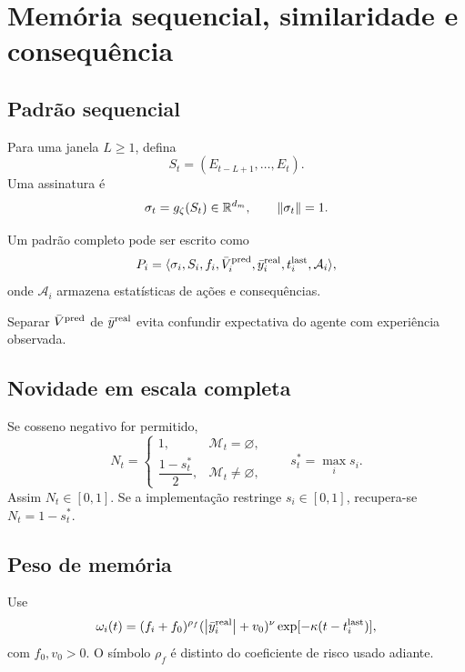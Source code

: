 \section{Memória sequencial, similaridade e consequência}

\subsection{Padrão sequencial}

Para uma janela \(L\ge1\), defina
\begin{equation}
S_t=(E_{t-L+1},\ldots,E_t).
\end{equation}
Uma assinatura é
\begin{equation}
\sigma_t=g_\zeta(S_t)\in\mathbb{R}^{d_m},
\qquad
\left\lVert \sigma_t \right\rVert=1.
\end{equation}

Um padrão completo pode ser escrito como
\begin{equation}
P_i=\langle
\sigma_i,S_i,f_i,
\bar V_i^{\rm pred},
\bar y_i^{\rm real},
t_i^{\rm last},
\mathcal A_i
\rangle,
\label{eq:pattern_advanced}
\end{equation}
onde \(\mathcal A_i\) armazena estatísticas de ações e consequências.

Separar \(\bar V^{\rm pred}\) de \(\bar y^{\rm real}\) evita confundir expectativa do agente com experiência observada.

\subsection{Novidade em escala completa}

Se cosseno negativo for permitido,
\begin{equation}
N_t=
\begin{cases}
1, & \mathcal M_t=\varnothing,\\[1mm]
\dfrac{1-s_t^*}{2}, & \mathcal M_t\neq\varnothing,
\end{cases}
\qquad
s_t^*=\max_i s_i.
\label{eq:novelty_full}
\end{equation}
Assim \(N_t\in[0,1]\). Se a implementação restringe \(s_i\in[0,1]\), recupera-se \(N_t=1-s_t^*\).

\subsection{Peso de memória}

Use
\begin{equation}
\omega_i(t)=
(f_i+f_0)^{\rho_f}
(\left\lvert \bar y_i^{\rm real} \right\rvert+v_0)^{\nu}
\exp[-\kappa(t-t_i^{\rm last})],
\label{eq:memory_weight}
\end{equation}
com \(f_0,v_0>0\). O símbolo \(\rho_f\) é distinto do coeficiente de risco usado adiante.


